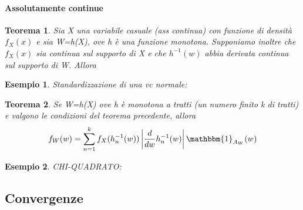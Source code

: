 \documentclass[11pt]{article}
\newtheorem{esempio}{Esempio}
\newtheorem{teo}{Teorema}
\begin{document}
\paragraph{Assolutamente continue}
\begin{teo}
Sia X una variabile casuale (ass continua) con funzione di densità $f_X(x)$ e sia W=h(X), ove h è una funzione monotona. 
Supponiamo inoltre che $f_X(x)$ sia continua sul supporto di X e che $h^{-1}(w)$ abbia derivata continua sul supporto di W. Allora
\end{teo}
\begin{esempio}
Standardizzazione di una vc normale:
\end{esempio}
\begin{teo}
Se W=h(X) ove h è monotona a tratti (un numero finito k di tratti) e valgono le condizioni del teorema precedente, allora
$$f_W(w)=\sum_{n=1}^k f_X(h_n^{-1}(w))\left|\frac{d}{dw}h_n^{-1}(w)\right|\mathbbm{1}_{A_W}(w)$$
\end{teo}
\begin{esempio}
CHI-QUADRATO:
\end{esempio}
\subsection{Convergenze}
\end{document}
